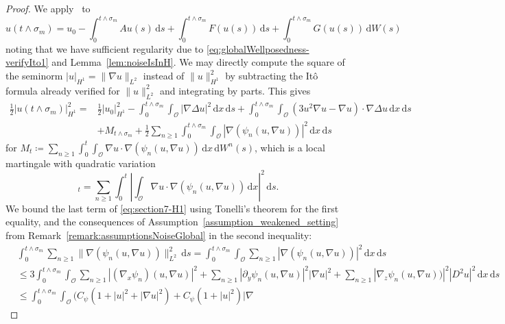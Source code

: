 \documentclass[reqno]{amsart}
\newcommand{\sO}{\mathscr{O}}
\newcommand{\ce}{\coloneqq}
\newcommand{\1}{\mathbf{1}}
\newcommand{\grad}{\nabla}
\newcommand{\ds}{\,\mathrm{d}s}
\newcommand{\dx}{\,\mathrm{d}x}
\newcommand{\dWs}{\,\mathrm{d}W(s)}
\newcommand{\dWsn}{\,\mathrm{d}W^n(s)}
\newcommand{\intt}{\int_0^t}
\newcommand{\inttm}{\int_0^{t\wedge\sigma_m}}
\newcommand{\intsO}{\int_{\sO}}
\begin{document}
\begin{proof} 
     We apply~\cite[Lemma A.5]{agrestiNonlinearSPDEsMaximal2025} to
    \begin{equation*}
     u(t\wedge\sigma_m) = u_0 - \inttm Au(s)\ds + \inttm F(u(s))\ds +\inttm G(u(s))\dWs
    \end{equation*}
    noting that we have sufficient regularity due to \eqref{eq:globalWellposedness-verifyIto1} and Lemma~\ref{lem:noiseIsInH}. We may directly compute the square of the seminorm $|u|_{H^1}=\|\grad u\|_{L^2}$ instead of $\|u\|_{H^1}^2$ by subtracting the Itô formula already verified for $\|u\|_{L^2}^2$ and integrating by parts. This gives
    \begin{equation}\label{eq:section7-H1}
    \begin{aligned}
    \frac{1}{2}|u(t \land \sigma_m)|^2_{H^1} = &\frac{1}{2}|u_0|^2_{H^1} - \inttm \intsO |\grad \Delta u|^2
    \dx \ds
    + \inttm \intsO  (3u^2 \grad u- \grad u) \cdot \grad \Delta u \dx \ds  \\
   & + M_{t\land\sigma_m} +  \frac{1}{2} \sum_{n \geq 1}  \inttm  \intsO |\grad (\psi_n(u, \grad u))|^2 \dx \ds
    \end{aligned}
    \end{equation}
    for $M_t \ce  \sum_{n \geq 1} \intt  \intsO \grad u \cdot \grad(\psi_n(u, \grad u))\dx \dWsn$,
    which is a local martingale with quadratic variation
    \begin{equation*}
     [M]_t =  \sum_{n \geq 1}  \intt \left|\intsO \grad u \cdot \grad (\psi_n(u,\grad u)) \dx \right|^2 \ds.
    \end{equation*}
    We bound the last term of \eqref{eq:section7-H1} using Tonelli's theorem for the first equality, and the consequences of Assumption~\ref{assumption_weakened_setting}  
    from Remark~\ref{remark:assumptionsNoiseGlobal} in the second inequality:
     \begin{equation}\label{eq:section7-h1quadvar}
     \begin{aligned}
        &\inttm \sum_{n \geq 1} \|\grad (\psi_n(u,\grad u))\|_{L^2}^2\ds
         = \inttm  \intsO \sum_{n \geq 1} |\grad (\psi_n(u,\grad u))|^2\dx\ds\\
        & \leq 3 \inttm  \intsO \sum_{n \geq 1} |(\grad_x\psi_n)(u,\grad u)|^2 + \sum_{n \geq 1} |\partial_y
     \psi_n(u,\grad u)|^2|\grad u|^2 + \sum_{n \geq 1} |\grad_z\psi_n(u,\grad u))|^2|D^2u|^2 \dx\ds\\
        &\le \inttm  \intsO \big(C_\psi (1+|u|^2+|\grad u|^2)+ C_\psi (1+|u|^2)|\grad

\end{aligned}
\end{equation}
\end{proof}
\end{document}
